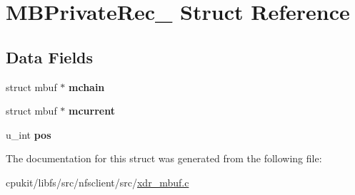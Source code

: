 \hypertarget{structMBPrivateRec__}{}\section{M\+B\+Private\+Rec\+\_\+ Struct Reference}
\label{structMBPrivateRec__}
\subsection*{Data Fields}
\begin{DoxyCompactItemize}
\item 
\mbox{\label{structMBPrivateRec___a480b0b7c028850ce76a526586cf9705e}} 
struct mbuf $\ast$ {\bfseries mchain}
\item 
\mbox{\label{structMBPrivateRec___a2db5919aa6329802112845cb47665606}} 
struct mbuf $\ast$ {\bfseries mcurrent}
\item 
\mbox{\label{structMBPrivateRec___a4d8cf1d7ff3bb2660f111925a9e6afc3}} 
u\+\_\+int {\bfseries pos}
\end{DoxyCompactItemize}


The documentation for this struct was generated from the following file\+:\begin{DoxyCompactItemize}
\item 
cpukit/libfs/src/nfsclient/src/\mbox{\hyperlink{xdr__mbuf_8c}{xdr\+\_\+mbuf.\+c}}\end{DoxyCompactItemize}
